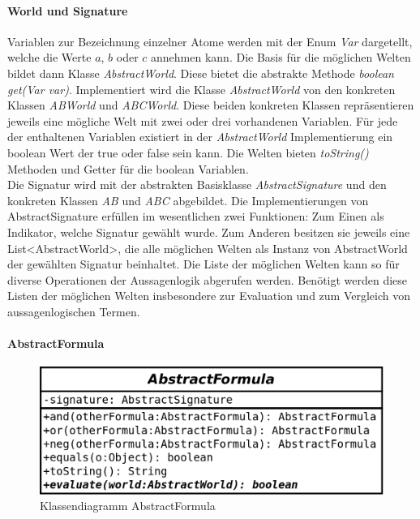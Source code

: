 \documentclass[12pt,a4paper]{article}
\begin{document}
\paragraph{World und Signature}
Variablen zur Bezeichnung einzelner Atome werden mit der Enum \textit{Var} dargetellt, welche die Werte $a$, $b$ oder $c$ annehmen kann. Die Basis für die möglichen Welten bildet dann Klasse \textit{AbstractWorld}. Diese bietet die abstrakte Methode \textit{boolean get(Var var)}. Implementiert wird die Klasse \textit{AbstractWorld} von den konkreten Klassen \textit{ABWorld} und  \textit{ABCWorld}. Diese beiden konkreten Klassen repräsentieren jeweils eine mögliche Welt mit zwei oder drei vorhandenen Variablen. Für jede der enthaltenen Variablen existiert in der \textit{AbstractWorld} Implementierung ein boolean Wert der true oder false sein kann. Die Welten bieten \textit{toString()} Methoden und Getter für die boolean Variablen. \\
Die Signatur wird mit der abstrakten Basisklasse  \textit{AbstractSignature} und den konkreten Klassen \textit{AB} und  \textit{ABC} abgebildet. Die Implementierungen von AbstractSignature erfüllen im wesentlichen zwei Funktionen: Zum Einen als Indikator, welche Signatur gewählt wurde. Zum Anderen besitzen sie jeweils eine List<AbstractWorld>,  die alle möglichen Welten als Instanz von AbstractWorld der gewählten Signatur beinhaltet. Die Liste der möglichen Welten kann so für diverse Operationen der Aussagenlogik abgerufen werden. Benötigt werden diese Listen der möglichen Welten insbesondere zur Evaluation und zum Vergleich von aussagenlogischen Termen.

\paragraph{AbstractFormula}


\begin{figure}
\includegraphics[width=0.55\linewidth]{bilder/AbstractFormula.png}
\caption{Klassendiagramm AbstractFormula}
\label{pic:abstractformula}
\end{figure}
\end{document}
